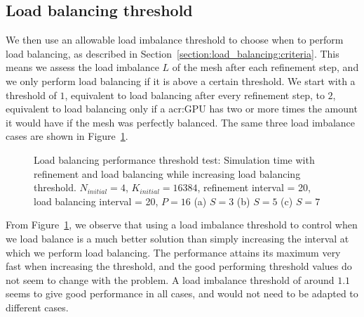 \subsection{Load balancing threshold}\label{subsection:results:load_balancing_performance:threshold}

We then use an allowable load imbalance threshold to choose when to perform load balancing, as
described in Section~\ref{section:load_balancing:criteria}. This means we assess the load imbalance
\(L\) of the mesh after each refinement step, and we only perform load balancing if it is above a
certain threshold. We start with a threshold of \(1\), equivalent to load balancing after every
refinement step, to \(2\), equivalent to load balancing only if a \acrshort{acr:GPU} has two or more
times the amount it would have if the mesh was perfectly balanced. The same three load imbalance
cases are shown in Figure~\ref{fig:load_balancing_efficiency_threshold}.

\begin{figure}[H]
	\centering
	\hfill
	\hfill
	\caption{Load balancing performance threshold test: Simulation time with refinement and load balancing while increasing load balancing threshold. \(N_{initial} = 4\), \(K_{initial} = 16384\), refinement interval = 20, load balancing interval = 20, \(P = 16\) (a) \(S = 3\) (b) \(S = 5\) (c) \(S = 7\)}\label{fig:load_balancing_efficiency_threshold}
\end{figure}

From Figure~\ref{fig:load_balancing_efficiency_threshold}, we observe that using a load imbalance
threshold to control when we load balance is a much better solution than simply increasing the
interval at which we perform load balancing. The performance attains its maximum very fast when
increasing the threshold, and the good performing threshold values do not seem to change with the
problem. A load imbalance threshold of around \(1.1\) seems to give good performance in all cases,
and would not need to be adapted to different cases.

